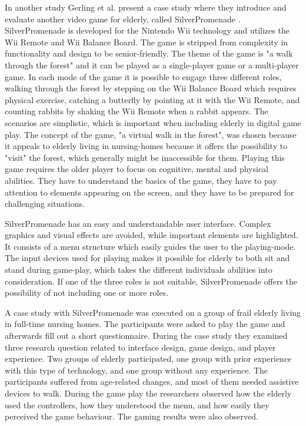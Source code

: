 In another study Gerling et al. present a case study where they introduce and evaluate another video game for elderly, called SilverPromenade \cite{gerling2}.  SilverPromenade is developed for the Nintendo Wii technology and utilizes the Wii Remote and Wii Balance Board. The game is stripped from complexity in functionality and design to be senior-friendly. The theme of the game is "a walk through the forest" and it can be played as a single-player game or a multi-player game. In each mode of the game it is possible to engage three different roles, walking through the forest by stepping on the Wii Balance Board which requires physical exercise, catching a butterfly by pointing at it with the Wii Remote, and counting rabbits by shaking the Wii Remote when a rabbit appears. The scenarios are simplistic, which is important when including elderly in digital game play. The concept of the game, "a virtual walk in the forest", was chosen because it appeals to elderly living in nursing-homes because it offers the possibility to "visit" the forest, which generally might be inaccessible for them. Playing this game requires the older player to focus on cognitive, mental and physical abilities. They have to understand the basics of the game, they have to pay attention to elements appearing on the screen, and they have to be prepared for challenging situations. 

SilverPromenade has an easy and understandable user interface. Complex graphics and visual effects are avoided, while important elements are highlighted. It consists of a menu structure which easily guides the user to the playing-mode. The input devices used for playing makes it possible for elderly to both sit and stand during game-play, which takes the different individuals abilities into consideration.  If one of the three roles is not suitable, SilverPromenade offers the possibility of not including one or more roles.

A case study with SilverPromenade was executed on a group of frail elderly living in full-time nursing homes. The participants were asked to play the game and afterwards fill out a short questionnaire. During the case study they examined three research question related to interface design, game design, and player experience. Two groups of elderly participated, one group with prior experience with this type of technology, and one group without any experience. The participants suffered from age-related changes, and most of them needed assistive devices to walk. During the game play the researchers observed how the elderly used the controllers, how they understood the menu, and how easily they perceived the game behaviour. The gaming results were also observed.

